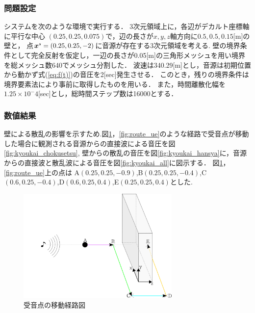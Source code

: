 \documentclass[dvipdfmx]{ampbt}
\def\vector#1{\mbox{\boldmath $#1$}}
\begin{document}
\subsubsection{問題設定}
\label{問題設定}
システムを次のような環境で実行する．
3次元領域上に，各辺がデカルト座標軸に平行な中心 $(0.25,0.25,0.075)$で，辺の長さが$x,y,z$軸方向に$0.5,0.5,0.15$[m]の壁と，
点$\vector{x}^{s}=(0.25,0.25,-2)$に音源が存在する3次元領域を考える.
壁の境界条件として完全反射を仮定し，一辺の長さが0.05[m]の三角形メッシュを用い境界を総メッシュ数640でメッシュ分割した．
波速は340.29[m]とし，音源は初期位置から動かず式(\ref{eq:f(t)})の音圧を2[sec]発生させる．
このとき，残りの境界条件は境界要素法により事前に取得したものを用いる．
また，時間離散化幅を$1.25 \times 10^-4$[sec]とし，総時間ステップ数は16000とする．\par

\subsubsection{数値結果}
壁による散乱の影響を示すため.図\ref{fig:route}，\ref{fig:route_ue}のような経路で受音点が移動した場合に観測される音源からの直接波による音圧を図\ref{fig:kyoukai_chokusetsu},
壁からの散乱の音圧を図\ref{fig:kyoukai_hansya}に，音源からの直接波と散乱波による音圧を図\ref{fig:kyoukai_all}に図示する．
図\ref{fig:route}，\ref{fig:route_ue}上の点は
A$(0.25,0.25,-0.9)$,B$(0.25,0.25,-0.4)$,C$(0.6,0.25,-0.4)$,D$(0.6,0.25,0.4)$,E$(0.25,0.25,0.4)$とした.

\begin{figure}[H]
  \begin{center}
    \includegraphics[clip,width=8.0cm]{./png/route.png}
    \caption{受音点の移動経路図}
    \label{fig:route}
  \end{center}
\end{figure}\\
\end{document}
